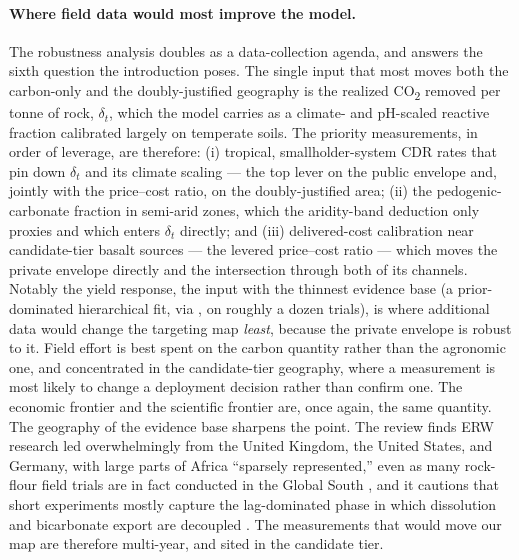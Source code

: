\documentclass[12pt]{article}
\newcommand{\co}{CO\textsubscript{2}}
\begin{document}
\paragraph{Where field data would most improve the model.} The robustness analysis
doubles as a data-collection agenda, and answers the sixth question the introduction
poses. The single input that most moves both the carbon-only and the
doubly-justified geography is the realized \co{} removed per tonne of rock,
$\delta_t$, which the model carries as a climate- and pH-scaled reactive fraction
calibrated largely on temperate soils. The priority measurements, in order of
leverage, are therefore: (i) tropical, smallholder-system CDR rates that pin down
$\delta_t$ and its climate scaling --- the top lever on the public envelope and,
jointly with the price--cost ratio, on the doubly-justified area; (ii) the
pedogenic-carbonate fraction in semi-arid zones, which the aridity-band deduction
only proxies and which enters $\delta_t$ directly; and (iii) delivered-cost
calibration near candidate-tier basalt sources --- the levered price--cost ratio ---
which moves the private envelope directly and the intersection through both of its
channels. Notably the yield response, the input with the thinnest evidence base
(a prior-dominated hierarchical fit, via \citealp{burkner2017}, on roughly a
dozen trials), is where additional data would
change the targeting map \emph{least}, because the private envelope is robust to it.
Field effort is best spent on the carbon quantity rather than the agronomic one, and
concentrated in the candidate-tier geography, where a measurement is most likely to
change a deployment decision rather than confirm one. The economic frontier and the
scientific frontier are, once again, the same quantity. The geography of the
evidence base sharpens the point. The review finds ERW research led
overwhelmingly from the United Kingdom, the United States, and Germany, with
large parts of Africa ``sparsely represented,'' even as many rock-flour field
trials are in fact conducted in the Global South
\citep[\S2.5]{suhrhoff2026esroc}, and it cautions that short experiments mostly
capture the lag-dominated phase in which dissolution and bicarbonate export are
decoupled \citep[\S3.4.6]{suhrhoff2026esroc}. The measurements that would move
our map are therefore multi-year, and sited in the candidate tier.
\end{document}
